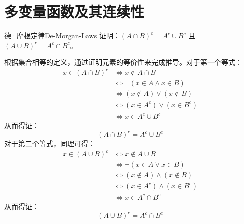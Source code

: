 \section{多变量函数及其连续性}

\begin{problem}{德·摩根定律}{De-Morgan-Laws}
    证明：$(A \cap B)^c = A^c \cup B^c$ 且 $(A \cup B)^c = A^c \cap B^c$。
\end{problem}

\begin{myproof}
    根据集合相等的定义，通过证明元素的等价性来完成推导。对于第一个等式：
    \begin{equation}
        \begin{aligned}
            x \in (A \cap B)^c & \iff x \notin A \cap B              \\
                               & \iff \neg (x \in A \land x \in B)   \\
                               & \iff (x \notin A) \lor (x \notin B) \\
                               & \iff (x \in A^c) \lor (x \in B^c)   \\
                               & \iff x \in A^c \cup B^c
        \end{aligned}
    \end{equation}
    从而得证：
    \begin{equation}
        \boxed{(A \cap B)^c = A^c \cup B^c}
    \end{equation}
    对于第二个等式，同理可得：
    \begin{equation}
        \begin{aligned}
            x \in (A \cup B)^c & \iff x \notin A \cup B               \\
                               & \iff \neg (x \in A \lor x \in B)     \\
                               & \iff (x \notin A) \land (x \notin B) \\
                               & \iff (x \in A^c) \land (x \in B^c)   \\
                               & \iff x \in A^c \cap B^c
        \end{aligned}
    \end{equation}
    从而得证：
    \begin{equation}
        \boxed{(A \cup B)^c = A^c \cap B^c}
    \end{equation}
\end{myproof}


